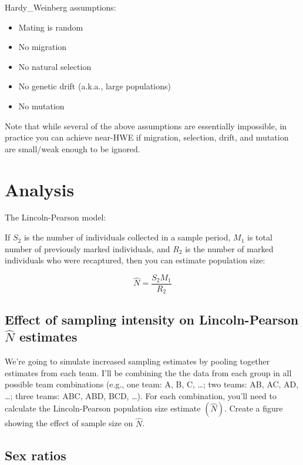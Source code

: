 \documentclass[]{book}
\providecommand{\tightlist}{%
  \setlength{\itemsep}{0pt}\setlength{\parskip}{0pt}}
\begin{document}
Hardy\_Weinberg assumptions:

\begin{itemize}
\tightlist
\item
  Mating is random
\item
  No migration
\item
  No natural selection
\item
  No genetic drift (a.k.a., large populations)
\item
  No mutation
\end{itemize}

Note that while several of the above assumptions are essentially
impossible, in practice you can achieve near-HWE if migration,
selection, drift, and mutation are small/weak enough to be ignored.

\section{Analysis}\label{analysis-1}

The Lincoln-Pearson model:

If \(S_2\) is the number of individuals collected in a sample period,
\(M_1\) is total number of previously marked individuals, and \(R_2\) is
the number of marked individuals who were recaptured, then you can
estimate population size:

\[\hat{N} = \frac{S_2 M_1}{R_2}\]

\subsection{\texorpdfstring{Effect of sampling intensity on
Lincoln-Pearson \(\hat{N}\)
estimates}{Effect of sampling intensity on Lincoln-Pearson \textbackslash{}hat\{N\} estimates}}\label{effect-of-sampling-intensity-on-lincoln-pearson-hatn-estimates}

We're going to simulate increased sampling estimates by pooling together
estimates from each team. I'll be combining the the data from each group
in all possible team combinations (e.g., one team: A, B, C, \ldots{};
two teams: AB, AC, AD, \ldots{}; three teams: ABC, ABD, BCD, \ldots{}).
For each combination, you'll need to calculate the Lincoln-Pearson
population size estimate \((\hat{N})\). Create a figure showing the
effect of sample size on \(\hat{N}\).

\subsection{Sex ratios}\label{sex-ratios}
\end{document}
